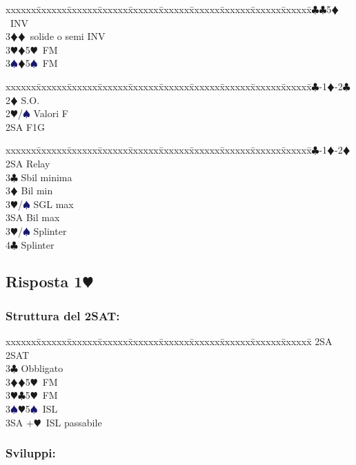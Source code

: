 \documentclass[a4paper,italian]{article}
\newcommand{\BC}{\textcolor{OliveGreen}{$\clubsuit$}}
\newcommand{\BD}{\textcolor{RedOrange}{$\vardiamondsuit$}}
\newcommand{\BH}{\textcolor{Red2}{$\varheartsuit${}}}
\newcommand{\BS}{\textcolor{MidnightBlue}{$\spadesuit${}}}
\newcommand{\pdfh}{\texorpdfstring{\BH{}}{H}}
\newenvironment{bidtable}
{\begin{tabbing}

    xxxxxx\=xxxxxx\=xxxxxx\=xxxxxx\=xxxxxx\=xxxxxx\=xxxxxx\=xxxxxx\=xxxxxx\=xxxxxx\=\kill}
{\end{tabbing} }%
\begin{document}
\begin{multicols}{2}
\begin{bidtable}
        3\BC {}\BC 5\BD\ INV\\
        3\BD {}\BD\ solide o semi INV\\
        3\BH {}\BD 5\BH\ FM\\
        3\BS {}\BD 5\BS\ FM\-
    \end{bidtable}
    \bigbreak
    \begin{bidtable}
        1\BC-1\BD-2\BC\+\\
        2\BD \> S.O.\\
        2\BH/\BS \> Valori F\\
        2SA \> F1G\-
    \end{bidtable}
    \bigbreak
    \begin{bidtable}
        1\BC-1\BD-2\BD\+\\
        2SA \> Relay\+\\
        3\BC \> Sbil minima\\
        3\BD \> Bil min\\
        3\BH/\BS \> SGL max\\
        3SA \> Bil max\-\\
        3\BH/\BS \> Splinter\\
        4\BC \> Splinter\-
    \end{bidtable}

    \subsection{Risposta 1\pdfh}

    \subsubsection{Struttura del 2SAT:}

    \begin{bidtable}
        2SA \> 2SAT\+\\
        3\BC \> Obbligato\+\\
        3\BD {}\BD 5\BH\ FM\\
        3\BH {}\BC 5\BH\ FM\\
        3\BS {}\BH 5\BS\ ISL\\
        3SA +\BH\ ISL passabile\-\-
    \end{bidtable}

    \subsubsection{Sviluppi:}


\end{multicols}
\end{document}
